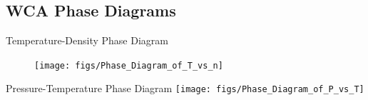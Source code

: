 \documentclass{beamer}
\begin{document}



\subsection*{WCA Phase Diagrams}
\begin{frame}{Temperature-Density Phase Diagram}
    \begin{figure}
        \centering
        \texttt{[image: figs/Phase\_Diagram\_of\_T\_vs\_n]}
        \label{fig:Phase_Diagram_of_T_vs_n}
    \end{figure}
\end{frame}

\begin{frame}{Pressure-Temperature Phase Diagram}
    \centering
    \texttt{[image: figs/Phase\_Diagram\_of\_P\_vs\_T]}\\
    \vspace{-1em}
\end{frame}





\end{document}
